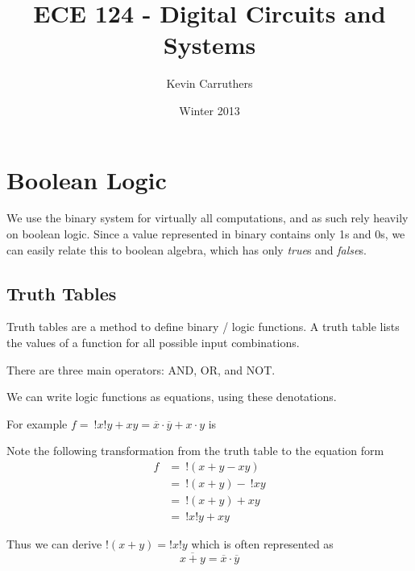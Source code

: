 \documentclass[12pt]{article}
\begin{document}
\title{ECE 124 - Digital Circuits and Systems}
\author{Kevin Carruthers}
\date{\vspace{-2ex}Winter 2013}
\maketitle\HRule

\section*{Boolean Logic}
We use the binary system for virtually all computations, and as such rely heavily on boolean logic. Since a value represented in binary contains only 1s and 0s, we can easily relate this to boolean algebra, which has only \emph{true}s and \emph{false}s.

\subsection*{Truth Tables}
Truth tables are a method to define binary / logic functions. A truth table lists the values of a function for all possible input combinations.

There are three main operators: AND, OR, and NOT.

We can write logic functions as equations, using these denotations.

For example $f = \ !x!y + xy = \overline{x} \cdot \overline{y} + x \cdot y$ is 

Note the following transformation from the truth table to the equation form
\begin{align*}
f &=\ !(x + y - xy)\\
  &=\ !(x + y) -\ !xy\\
  &=\ !(x + y) + xy\\
  &=\ !x!y + xy
\end{align*}

Thus we can derive $!(x + y) = !x!y$ which is often represented as \[ \overline{x+y} = \overline{x} \cdot \overline{y} \]
\end{document}
